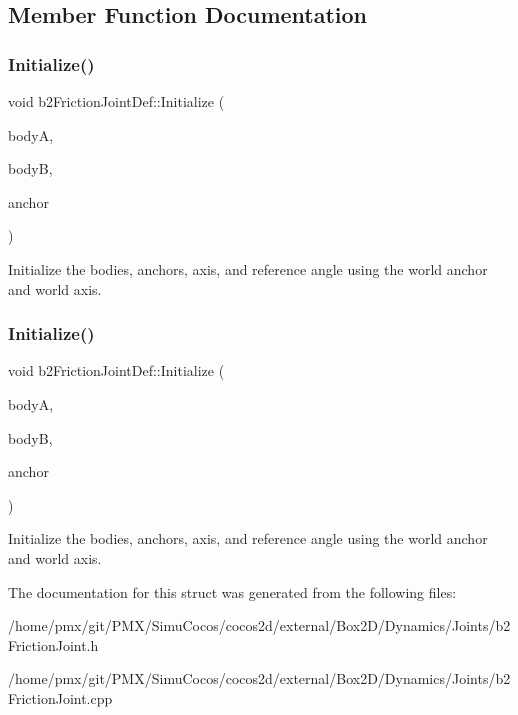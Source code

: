 \subsection{Member Function Documentation}
\mbox{\label{structb2FrictionJointDef_aee104f2aeb34dec4e17e3c52a98f7915}} 
\subsubsection{\texorpdfstring{Initialize()}{Initialize()}\hspace{0.1cm}{\footnotesize\ttfamily [1/2]}}
{\footnotesize\ttfamily void b2\+Friction\+Joint\+Def\+::\+Initialize (\begin{DoxyParamCaption}\item[{\hyperlink{classb2Body}{b2\+Body} $\ast$}]{bodyA,  }\item[{\hyperlink{classb2Body}{b2\+Body} $\ast$}]{bodyB,  }\item[{const \hyperlink{structb2Vec2}{b2\+Vec2} \&}]{anchor }\end{DoxyParamCaption})}

Initialize the bodies, anchors, axis, and reference angle using the world anchor and world axis. \mbox{\label{structb2FrictionJointDef_aee104f2aeb34dec4e17e3c52a98f7915}} 
\subsubsection{\texorpdfstring{Initialize()}{Initialize()}\hspace{0.1cm}{\footnotesize\ttfamily [2/2]}}
{\footnotesize\ttfamily void b2\+Friction\+Joint\+Def\+::\+Initialize (\begin{DoxyParamCaption}\item[{\hyperlink{classb2Body}{b2\+Body} $\ast$}]{bodyA,  }\item[{\hyperlink{classb2Body}{b2\+Body} $\ast$}]{bodyB,  }\item[{const \hyperlink{structb2Vec2}{b2\+Vec2} \&}]{anchor }\end{DoxyParamCaption})}

Initialize the bodies, anchors, axis, and reference angle using the world anchor and world axis. 

The documentation for this struct was generated from the following files\+:\begin{DoxyCompactItemize}
\item 
/home/pmx/git/\+P\+M\+X/\+Simu\+Cocos/cocos2d/external/\+Box2\+D/\+Dynamics/\+Joints/b2\+Friction\+Joint.\+h\item 
/home/pmx/git/\+P\+M\+X/\+Simu\+Cocos/cocos2d/external/\+Box2\+D/\+Dynamics/\+Joints/b2\+Friction\+Joint.\+cpp\end{DoxyCompactItemize}

